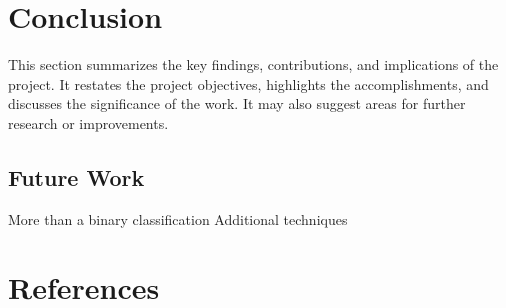 \documentclass[journal]{IEEEtran}
\begin{document}
	\section{Conclusion}
	\label{sec:conclusion}
	This section summarizes the key findings, contributions, and implications of the project. It restates the project objectives, highlights the accomplishments, and discusses the significance of the work. It may also suggest areas for further research or improvements.
	
	\subsection{Future Work}
	More than a binary classification
	Additional techniques
	
	\section*{References}
	\label{sec:references}
	
	
\end{document}
